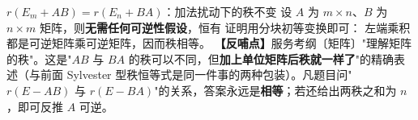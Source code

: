 \begin{fdeep}{$r(E_m+AB)=r(E_n+BA)$：加法扰动下的秩不变}
设 $A$ 为 $m\times n$、$B$ 为 $n\times m$ 矩阵，则\textbf{无需任何可逆性假设}，恒有
证明用分块初等变换即可：
左端乘积都是可逆矩阵乘可逆矩阵，因而秩相等。
\textbf{【反哺点】}服务考纲〔矩阵〕"理解矩阵的秩"。这是"$AB$ 与 $BA$ 的秩可以不同，但\textbf{加上单位矩阵后秩就一样了}"的精确表述（与前面 Sylvester 型秩恒等式是同一件事的两种包装）。凡题目问"$r(E-AB)$ 与 $r(E-BA)$"的关系，答案永远是\textbf{相等}；若还给出两秩之和为 $n$，即可反推 $A$ 可逆。
\end{fdeep}


